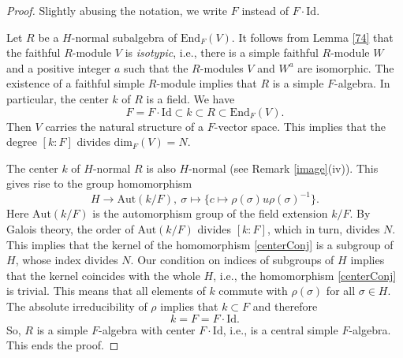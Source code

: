 \documentclass[12pt,a4paper,reqno]{amsart}
\def\End{\mathrm{End}}
\def\Aut{\mathrm{Aut}}
\def\Id{\mathrm{Id}}
\def\dim{\mathrm{dim}}
\theoremstyle{definition}
\begin{document}
\begin{proof}
Slightly abusing the notation, we write $F$ instead of $F\cdot \Id$.

Let $R$ be a $H$-normal subalgebra of $\End_F(V)$. It follows from Lemma \ref{74} that the faithful $R$-module $V$ is {\sl isotypic}, i.e., there is a simple faithful  $R$-module $W$  and a positive integer $a$ such that the $R$-modules $V$ and $W^a$ are isomorphic. The existence of a faithful simple $R$-module implies that $R$ is a simple $F$-algebra. In particular, the center $k$ of $R$ is a field. We have
$$F=F\cdot \Id\subset k\subset R\subset \End_F(V).$$
Then $V$ carries the natural structure of a $F$-vector space. This implies that the degree
$[k:F]$ divides $\dim_F(V)=N$.

The center $k$ of $H$-normal $R$ is also $H$-normal (see Remark \ref{image}(iv)). This gives rise to the group homomorphism
\begin{equation}
\label{centerConj}
H \to \Aut(k/F),  \ \sigma \mapsto \{c \mapsto \rho(\sigma)u \rho(\sigma)^{-1}\}.
\end{equation}
Here $\Aut(k/F)$ is the automorphism group of the field extension $k/F$. By Galois theory,
the order of $ \Aut(k/F)$ divides $[k: F]$, which in turn, divides $N$.  This implies
that the kernel of the homomorphism \eqref{centerConj} is a subgroup of $H$, whose index divides $N$.
Our condition on indices of subgroups of $H$ implies that the kernel coincides with the whole $H$,
i.e., the homomorphism \eqref{centerConj} is trivial. This means that all elements of $k$ commute with  $\rho(\sigma)$
for all $\sigma\in H$.  The absolute irreducibility of $\rho$ implies that $k\subset F$ and therefore
$$k= F=F\cdot \Id.$$
So, $R$ is a simple $F$-algebra with center $ F\cdot \Id$, i.e., is a central simple $F$-algebra. This ends the proof.
\end{proof}
\end{document}

